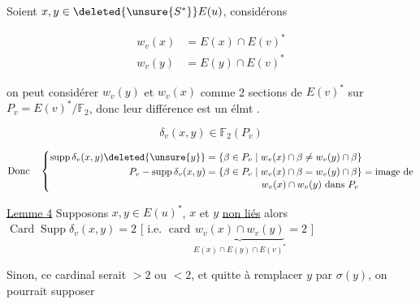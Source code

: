 
Soient $x,y\in\deleted{\unsure{S^*}}E(u)$, considérons

\[
\begin{aligned}
w_v(x)&=E(x)\cap E(v)^*\\
w_v(y)&=E(y)\cap E(v)^*
\end{aligned}
\]

  on peut considérer $w_v(y)$ et $w_v(x)$ comme 2 sections de $E(v)^*$ sur $P_v=E(v)^*/\mathbb F_2$, donc leur différence est un élmt .

\[
\delta_v(x,y)\in\mathbb F_2(P_v)
\]


\[
\text{Donc}\quad
\left\{\begin{aligned}
\operatorname{supp}\delta_v(x,y)\deleted{\unsure{y}}&=\{\beta\in P_v\mid w_v(x)\cap\beta\ne w_v(y)\cap\beta\}\\
P_v-\operatorname{supp}\delta_v(x,y)&=\{\beta\in P_v\mid w_v(x)\cap\beta=w_v(y)\cap\beta\}=\text{image de}\\[-2pt]
&\hspace{2cm}w_v(x)\cap w_v(y)\text{ dans }P_v
\end{aligned}\right.
\]

\uline{Lemme 4}  Supposons $x,y\in E(u)^*$, $x$ et $y$ \uline{non liés} alors $\operatorname{Card}\operatorname{Supp}\delta_v(x,y)=2$ [ i.e. $\operatorname{card}\underbrace{w_v(x)\cap w_v(y)}_{E(x)\cap E(y)\cap E(v)^*}=2$ ]

Sinon, ce cardinal serait $>2$ ou $<2$, et quitte à remplacer $y$ par $\sigma(y)$, on pourrait supposer
